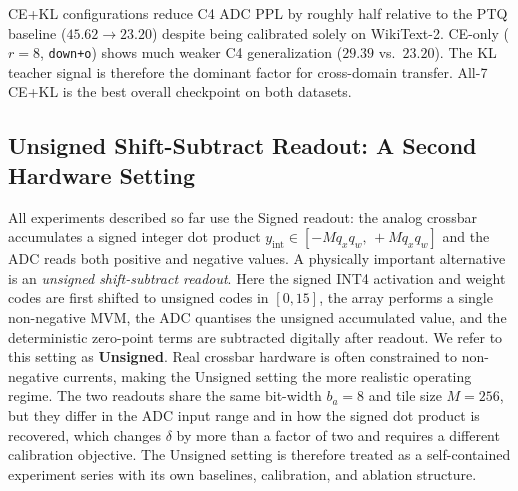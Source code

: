 \documentclass[a4paper,11pt,oneside]{article}
\theoremstyle{breakstyle}
\begin{document}
  CE+KL configurations reduce C4 ADC PPL by roughly half relative to
  the PTQ baseline ($45.62 \to 23.20$) despite being calibrated solely
  on WikiText-2.  CE-only ($r=8$, \texttt{down+o}) shows much weaker
  C4 generalization ($29.39$ vs.\ $23.20$).  The KL teacher signal is
  therefore the dominant factor for cross-domain transfer.
  All-7 CE+KL is the best overall checkpoint on both datasets.


  \subsection{Unsigned Shift-Subtract Readout: A Second Hardware Setting}
  \label{sec:unipolar}

  All experiments described so far use the Signed readout: the
  analog crossbar accumulates a signed integer dot product
  $y_{\mathrm{int}} \in [-M q_x q_w,\, +M q_x q_w]$ and the ADC reads
  both positive and negative values.  A physically important alternative is an
  \emph{unsigned shift-subtract readout}.  Here the signed INT4
  activation and weight codes are first shifted to unsigned codes
  in $[0, 15]$, the array performs a single non-negative MVM, the
  ADC quantises the unsigned accumulated value, and the
  deterministic zero-point terms are subtracted digitally after
  readout.  We refer to this setting as \textbf{Unsigned}.  Real
  crossbar hardware is often constrained to non-negative currents,
  making the Unsigned setting the more realistic operating regime.
  The two readouts share the same bit-width $b_a = 8$ and tile
  size $M = 256$, but they differ in the ADC input range and in
  how the signed dot product is recovered, which changes $\delta$
  by more than a factor of two and requires a different calibration
  objective.  The Unsigned setting is therefore treated as a
  self-contained experiment series with its own baselines,
  calibration, and ablation structure.
\end{document}
